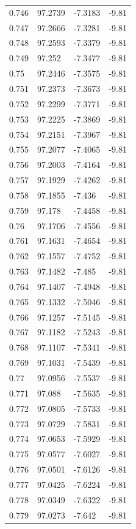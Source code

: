 \begin{tabular}{llll}
0.746 & 97.2739 & -7.3183 & -9.81 \\
0.747 & 97.2666 & -7.3281 & -9.81 \\
0.748 & 97.2593 & -7.3379 & -9.81 \\
0.749 & 97.252 & -7.3477 & -9.81 \\
0.75 & 97.2446 & -7.3575 & -9.81 \\
0.751 & 97.2373 & -7.3673 & -9.81 \\
0.752 & 97.2299 & -7.3771 & -9.81 \\
0.753 & 97.2225 & -7.3869 & -9.81 \\
0.754 & 97.2151 & -7.3967 & -9.81 \\
0.755 & 97.2077 & -7.4065 & -9.81 \\
0.756 & 97.2003 & -7.4164 & -9.81 \\
0.757 & 97.1929 & -7.4262 & -9.81 \\
0.758 & 97.1855 & -7.436 & -9.81 \\
0.759 & 97.178 & -7.4458 & -9.81 \\
0.76 & 97.1706 & -7.4556 & -9.81 \\
0.761 & 97.1631 & -7.4654 & -9.81 \\
0.762 & 97.1557 & -7.4752 & -9.81 \\
0.763 & 97.1482 & -7.485 & -9.81 \\
0.764 & 97.1407 & -7.4948 & -9.81 \\
0.765 & 97.1332 & -7.5046 & -9.81 \\
0.766 & 97.1257 & -7.5145 & -9.81 \\
0.767 & 97.1182 & -7.5243 & -9.81 \\
0.768 & 97.1107 & -7.5341 & -9.81 \\
0.769 & 97.1031 & -7.5439 & -9.81 \\
0.77 & 97.0956 & -7.5537 & -9.81 \\
0.771 & 97.088 & -7.5635 & -9.81 \\
0.772 & 97.0805 & -7.5733 & -9.81 \\
0.773 & 97.0729 & -7.5831 & -9.81 \\
0.774 & 97.0653 & -7.5929 & -9.81 \\
0.775 & 97.0577 & -7.6027 & -9.81 \\
0.776 & 97.0501 & -7.6126 & -9.81 \\
0.777 & 97.0425 & -7.6224 & -9.81 \\
0.778 & 97.0349 & -7.6322 & -9.81 \\
0.779 & 97.0273 & -7.642 & -9.81 \\

\end{tabular}
